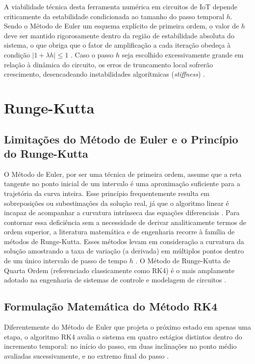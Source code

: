 \documentclass[12pt, a4paper]{article}
\begin{document}
A viabilidade técnica desta ferramenta numérica em circuitos de IoT depende criticamente da estabilidade condicionada ao tamanho do passo temporal $h$. Sendo o Método de Euler um esquema explícito de primeira ordem, o valor de $h$ deve ser mantido rigorosamente dentro da região de estabilidade absoluta do sistema, o que obriga que o fator de amplificação a cada iteração obedeça à condição $|1 + \lambda h| \le 1$ \cite{qi2026}. Caso o passo $h$ seja escolhido excessivamente grande em relação à dinâmica do circuito, os erros de truncamento local sofrerão crescimento, desencadeando instabilidades algorítmicas (\textit{stiffness}) \cite{qi2026, aselebe2026}.

\section{Runge-Kutta}

\subsection{Limitações do Método de Euler e o Princípio do Runge-Kutta}
O Método de Euler, por ser uma técnica de primeira ordem, assume que a reta tangente no ponto inicial de um intervalo é uma aproximação suficiente para a trajetória da curva inteira. Esse princípio frequentemente resulta em sobreposições ou subestimações da solução real, já que o algoritmo linear é incapaz de acompanhar a curvatura intrínseca das equações diferenciais \cite{stackexchange2015}. Para contornar essa deficiência sem a necessidade de derivar analiticamente termos de ordem superior, a literatura matemática e de engenharia recorre à família de métodos de Runge-Kutta. Esses métodos levam em consideração a curvatura da solução amostrando a taxa de variação (a derivada) em múltiplos pontos dentro de um único intervalo de passo de tempo $h$ \cite{firgelli2026rk, stackexchange2015}. O Método de Runge-Kutta de Quarta Ordem (referenciado classicamente como RK4) é o mais amplamente adotado na engenharia de sistemas de controle e modelagem de circuitos \cite{shaikh2022, firgelli2026rk}.

\subsection{Formulação Matemática do Método RK4}
Diferentemente do Método de Euler que projeta o próximo estado em apenas uma etapa, o algoritmo RK4 avalia o sistema em quatro estágios distintos dentro do incremento temporal: no início do passo, em duas inclinações no ponto médio avaliadas sucessivamente, e no extremo final do passo \cite{firgelli2026rk, wikipediaRK}. 
\end{document}
